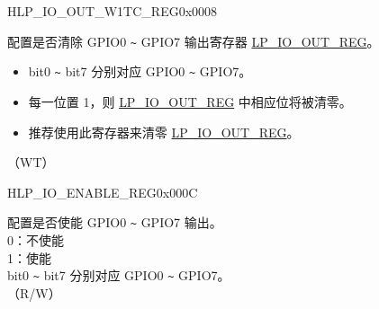 \begin{register}{H}{LP\_IO\_OUT\_W1TC\_REG}{0x0008}\label{regdesc:LPIOOUTW1TCREG}
%
%
\regnewline%
\begin{regdesc}\begin{reglist}
\label{fielddesc:LPIOOUTDATAW1TC}\item [LP\_GPIO\_OUT\_DATA\_W1TC] 配置是否清除 GPIO0 \verb+~+ GPIO7 输出寄存器 \hyperref[regdesc:LPIOOUTREG]{LP\_IO\_OUT\_REG}。\\
\begin{itemize}
    \item bit0 \verb+~+ bit7 分别对应 GPIO0 \verb+~+ GPIO7。
    \item 每一位置 1，则 \hyperref[regdesc:LPIOOUTREG]{LP\_IO\_OUT\_REG} 中相应位将被清零。
    \item 推荐使用此寄存器来清零 \hyperref[regdesc:LPIOOUTREG]{LP\_IO\_OUT\_REG}。\end{itemize}（WT）
\end{reglist}\end{regdesc}
\end{register}


\begin{register}{H}{LP\_IO\_ENABLE\_REG}{0x000C}\label{regdesc:LPIOENABLEREG}
%
%
\regnewline%
\begin{regdesc}\begin{reglist}
\label{fielddesc:LPGPIOENABLE}\item [LP\_GPIO\_ENABLE] 配置是否使能 GPIO0 \verb+~+ GPIO7 输出。\\
0：不使能\\
1：使能\\
bit0 \verb+~+ bit7 分别对应 GPIO0 \verb+~+ GPIO7。\\
（R/W）
\end{reglist}\end{regdesc}
\end{register}


